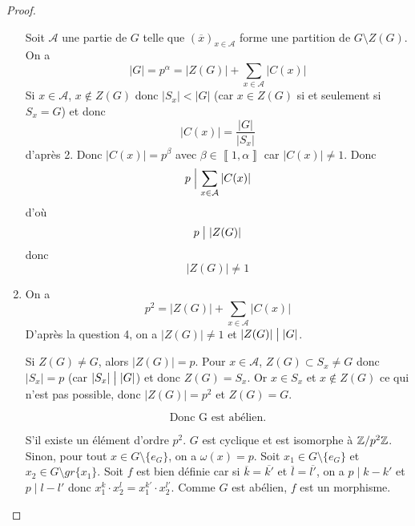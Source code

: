 \begin{proof}
\begin{enumerate}
		Soit $\mathcal{A}$ une partie de $G$ telle que $(\overline{x})_{x\in\mathcal{A}}$ forme une partition de $G\setminus Z(G)$. On a 
		\begin{equation}
			\vert G\vert=p^{\alpha}=\vert Z(G)\vert+\sum_{x\in\mathcal{A}}\vert C(x)\vert
		\end{equation}
		Si $x\in\mathcal{A}$, $x\notin Z(G)$ donc $\vert S_{x}\vert <\vert G\vert$ (car $x\in Z(G)$ si et seulement si $S_{x}=G$) et donc 
		\begin{equation}
			\vert C(x)\vert=\frac{\vert G\vert}{\vert S_{x}\vert}
		\end{equation}
		d'après 2. Donc $\vert C(x)\vert=p^{\beta}$ avec $\beta\in\left\llbracket 1,\alpha\right\rrbracket$ car $\vert C(x)\vert\neq 1$. Donc 
		\begin{equation}
			p\Bigm|\sum_{x\in\mathcal{A}}\vert C(x)\vert
		\end{equation}
		d'où 
		\begin{equation}
			p\bigm|\left\lvert Z(G)\right\rvert
		\end{equation}
		donc 
		\begin{equation}
			\boxed{\left\lvert Z(G)\right\rvert\neq1}
		\end{equation}

		\item On a 
		\begin{equation}
			p^{2}=\vert Z(G)\vert+\sum_{x\in\mathcal{A}}\vert C(x)\vert
		\end{equation}
		D'après la question 4, on a $\vert Z(G)\vert\neq1$ et $\vert Z(G)\vert\bigm|\vert G\vert$.

		Si $Z(G)\neq G$, alors $\vert Z(G)\vert=p$. Pour $x\in\mathcal{A}$, $Z(G)\subset S_{x}\neq G$ donc $\vert S_{x}\vert= p$ (car $\vert S_{x}\vert\bigm|\vert G\vert$) et donc $Z(G)=S_{x}$. Or $x\in S_{x}$ et $x\notin Z(G)$ ce qui n'est pas possible, donc $\vert Z(G)\vert=p^{2}$ et $Z(G)=G$. 
		
		\begin{equation}
			\boxed{\text{Donc G est abélien.}}
		\end{equation}

		S'il existe un élément d'ordre $p^{2}$. $G$ est cyclique et est isomorphe à $\mathbb{Z}/p^{2}\mathbb{Z}$. Sinon, pour tout $x\in G\setminus\{e_{G}\}$, on a $\omega(x)=p$. Soit $x_{1}\in G\setminus\{e_{G}\}$ et $x_{2}\in G\setminus gr\{x_{1}\}$.
		Soit 
		$f$ est bien définie car si $\overline{k}=\overline{k'}$ et $\overline{l}=\overline{l'}$, on a $p\mid k-k'$ et $p\mid l-l'$ donc $x_{1}^{k}\cdot x_{2}^{l}=x_{1}^{k'}\cdot x_{2}^{l'}$. Comme $G$ est abélien, $f$ est un morphisme. 
		

\end{enumerate}
\end{proof}

